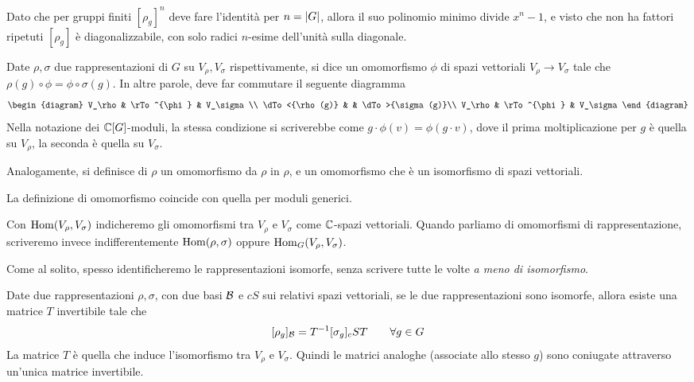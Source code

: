 	Dato che per gruppi finiti $[\rho_g]^n$ deve fare l'identità per $n=\left|G\right|$, allora il suo polinomio minimo divide $x^n-1$, e visto che non ha fattori ripetuti $[\rho_g]$ è diagonalizzabile, con solo radici $n$-esime dell'unità sulla diagonale. 

	\begin{mydef}
		Date $\rho,\sigma$ due rappresentazioni di $G$ su $V_\rho,V_\sigma$ rispettivamente, si dice  un omomorfismo $\phi$ di spazi vettoriali $V_\rho \rightarrow V_\sigma$ tale che $\rho(g) \circ \phi = \phi \circ \sigma(g)$. 
		In altre parole, deve far commutare il seguente diagramma
		\[
			\begin{diagram}
	V_\rho         & \rTo^{\phi}  & V_\sigma\\
	\dTo<{\rho(g)} &           	 & \dTo>{\sigma(g)}\\
	V_\rho         & \rTo^{\phi}  & V_\sigma
			\end{diagram}
		\]
		Nella notazione dei $\mathbb C[G]$-moduli, la stessa condizione si scriverebbe come $g\cdot \phi(v)=\phi(g\cdot v)$, dove il prima moltiplicazione per $g$ è quella su $V_\rho$, la seconda è quella su $V_\sigma$.
			
	Analogamente, si definisce  di $\rho$ un omomorfismo da $\rho$ in $\rho$, e  un omomorfismo che è un isomorfismo di spazi vettoriali.
	\end{mydef}

	\begin{myobs}
		La definizione di omomorfismo coincide con quella per moduli generici.
	\end{myobs}

	\begin{myobs}
		Con $\operatorname{Hom}(V_\rho,V_\sigma)$ indicheremo gli omomorfismi tra $V_\rho$ e $V_\sigma$ come $\mathbb C$-spazi vettoriali. Quando parliamo di omomorfismi di rappresentazione, scriveremo invece indifferentemente $\operatorname{Hom}(\rho,\sigma)$ oppure $\operatorname{Hom}_G(V_\rho,V_\sigma)$.
	\end{myobs}

	Come al solito, spesso identificheremo le rappresentazioni isomorfe, senza scrivere tutte le volte \emph{a meno di isomorfismo}.

	Date due rappresentazioni $\rho,\sigma$, con due basi $\mathcal B$ e $cS$ sui relativi spazi vettoriali, se le due rappresentazioni sono isomorfe, allora esiste una matrice $T$ invertibile tale che
	\[
		[\rho_g]_\mathcal B = T^{-1} [\sigma_g]_cS T \qquad \forall g\in G
	\]
	La matrice $T$ è quella che induce l'isomorfismo tra $V_\rho$ e $V_\sigma$.
	Quindi le matrici analoghe (associate allo stesso $g$) sono coniugate attraverso un'unica matrice invertibile.
			
